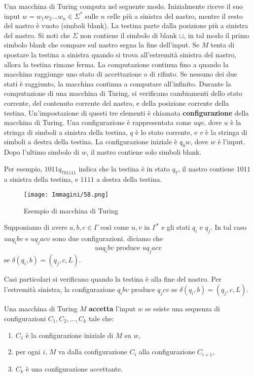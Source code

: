 \documentclass{article}
\begin{document}
Una macchina di Turing computa nel seguente modo.
Inizialmente riceve il suo input $w = w_1w_2...w_n \in \Sigma^*$ sulle $n$ celle più a sinistra del nastro, mentre il resto del nastro è vuoto (simboli blank).
La testina parte dalla posizione più a sinistra del nastro.
Si noti che $\Sigma$ non contiene il simbolo di blank $\sqcup$, in tal modo il primo simbolo blank che compare sul nastro segna la fine dell'input.
Se $M$ tenta di spostare la testina a sinistra quando si trova all'estremità sinistra del nastro, allora la testina rimane ferma.
La computazione continua fino a quando la macchina raggiunge uno stato di accettazione o di rifiuto.
Se nessuno dei due stati è raggiunto, la macchina continua a computare all'infinito.
Durante la computazione di una macchina di Turing, si verificano cambiamenti dello stato corrente, del contenuto corrente del nastro, e della posizione corrente della testina.
Un'impostazione di questi tre elementi è chiamata \textbf{configurazione} della macchina di Turing.
Una configurazione è rappresentata come $uqv$, dove $u$ è la stringa di simboli a sinistra della testina, $q$ è lo stato corrente, e $v$ è la stringa di simboli a destra della testina.
La configurazione iniziale è $q_0w$, dove $w$ è l'input.
Dopo l'ultimo simbolo di $w$, il nastro contiene solo simboli blank.

Per esempio, $1011q_701111$ indica che la testina è in stato $q_7$, il nastro contiene $1011$ a sinistra della testina, e $1111$ a destra della testina.

\begin{figure}[H]
    \centering
    \texttt{[image: Immagini/58.png]}
    \caption{Esempio di macchina di Turing}
    \label{fig:turing_machine_example2}
\end{figure}

Supponiamo di avere $a,b,c \in \Gamma$ così come $u,v$ in $\Gamma^*$ e gli stati $q_i$ e $q_j$.
In tal caso $uaq_ibv$ e $uq_jacv$ sono due configurazioni. diciamo che 
$$
uaq_ibv \text{ produce } uq_jacv
$$
se $\delta(q_i,b) = (q_j,c,L)$.

Casi particolari si verificano quando la testina è alla fine del nastro.
Per l'estremità sinistra, la configurazione $q_ibv$ produce $q_jcv$ se $\delta(q_i,b) = (q_j,c,L)$.

Una macchina di Turing $M$ \textbf{accetta} l'input $w$ se esiste una sequenza di configurazioni $C_1,C_2,...,C_k$ tale che:
\begin{enumerate}
    \item $C_1$ è la configurazione iniziale di $M$ su $w$,
    \item per ogni $i$, $M$ va dalla configurazione $C_i$ alla configurazione $C_{i+1}$,
    \item $C_k$ è una configurazione accettante.
\end{enumerate}
\end{document}
